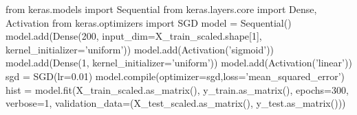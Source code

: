 \documentclass[11pt]{article}
\newenvironment{Shaded}{}{}
\newcommand{\DecValTok}[1]{\textcolor[rgb]{0.25,0.63,0.44}{{#1}}}
\newcommand{\FloatTok}[1]{\textcolor[rgb]{0.25,0.63,0.44}{{#1}}}
\newcommand{\StringTok}[1]{\textcolor[rgb]{0.25,0.44,0.63}{{#1}}}
\newcommand{\NormalTok}[1]{{#1}}
\newcommand{\ImportTok}[1]{{#1}}
\newcommand{\OperatorTok}[1]{\textcolor[rgb]{0.40,0.40,0.40}{{#1}}}
\newcommand{\BuiltInTok}[1]{{#1}}
\begin{document}
\begin{Shaded}
\begin{Highlighting}[]
\ImportTok{from}\NormalTok{ keras.models }\ImportTok{import}\NormalTok{ Sequential}
\ImportTok{from}\NormalTok{ keras.layers.core }\ImportTok{import}\NormalTok{ Dense, Activation}
\ImportTok{from}\NormalTok{ keras.optimizers }\ImportTok{import}\NormalTok{ SGD}
\NormalTok{model }\OperatorTok{=}\NormalTok{ Sequential()}
\NormalTok{model.add(Dense(}\DecValTok{200}\NormalTok{, input_dim}\OperatorTok{=}\NormalTok{X_train_scaled.shape[}\DecValTok{1}\NormalTok{], kernel_initializer}\OperatorTok{=}\StringTok{'uniform'}\NormalTok{))}
\NormalTok{model.add(Activation(}\StringTok{'sigmoid'}\NormalTok{))}
\NormalTok{model.add(Dense(}\DecValTok{1}\NormalTok{, kernel_initializer}\OperatorTok{=}\StringTok{'uniform'}\NormalTok{))}
\NormalTok{model.add(Activation(}\StringTok{'linear'}\NormalTok{))}
\NormalTok{sgd }\OperatorTok{=}\NormalTok{ SGD(lr}\OperatorTok{=}\FloatTok{0.01}\NormalTok{)}
\NormalTok{model.}\BuiltInTok{compile}\NormalTok{(optimizer}\OperatorTok{=}\NormalTok{sgd,loss}\OperatorTok{=}\StringTok{'mean_squared_error'}\NormalTok{)}
\NormalTok{hist }\OperatorTok{=}\NormalTok{ model.fit(X_train_scaled.as_matrix(), y_train.as_matrix(), epochs}\OperatorTok{=}\DecValTok{300}\NormalTok{,}
\NormalTok{    verbose}\OperatorTok{=}\DecValTok{1}\NormalTok{, validation_data}\OperatorTok{=}\NormalTok{(X_test_scaled.as_matrix(), y_test.as_matrix()))}
\end{Highlighting}
\end{Shaded}
\end{document}
